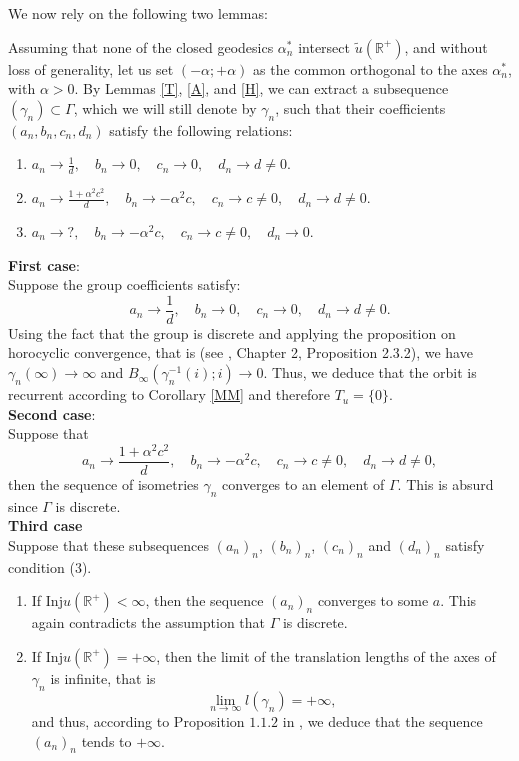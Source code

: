 \documentclass[11pt]{amsart}
\begin{document}
We now rely on the following two lemmas:

Assuming that none of the closed geodesics $\alpha^{*}_n$ intersect $\tilde{u}(\mathbb{R}^+)$, and without loss of generality, let us set $(-\alpha; +\alpha)$ as the common orthogonal to the axes $\alpha_n^{*}$, with $\alpha > 0$.
By Lemmas \ref{T}, \ref{A}, and \ref{H}, we can extract a subsequence $(\gamma_{n})\subset \Gamma$, which we will still denote by \(\gamma_n\), such that their coefficients \((a_n, b_n, c_n, d_n)\) satisfy the following relations:
\begin{enumerate}
    \item \(a_n \rightarrow \frac{1}{d}, \quad b_n \rightarrow 0, \quad c_n \rightarrow 0, \quad d_n \rightarrow d \neq 0.\)
    \item \(a_n \rightarrow \frac{1 + \alpha^2 c^2}{d}, \quad b_n \rightarrow -\alpha^2 c, \quad c_n \rightarrow c \neq 0, \quad d_n \rightarrow d \neq 0.\)
    \item \(a_n \rightarrow ?, \quad b_n \rightarrow -\alpha^2 c, \quad c_n \rightarrow c \neq 0, \quad d_n \rightarrow 0.\)
\end{enumerate}
\textbf{First case}:\\
Suppose the group coefficients satisfy: 
\[ a_n \rightarrow \frac{1}{d}, \quad b_n \rightarrow 0, \quad c_n \rightarrow 0, \quad d_n \rightarrow d \neq 0. \]
Using the fact that the group is discrete and applying the proposition on horocyclic convergence, that is (see \textbf{\cite{BellisThesis}}, Chapter 2, Proposition 2.3.2), we have \(\gamma_n(\infty) \rightarrow \infty\) and \(B_{\infty}(\gamma_n^{-1}(i); i) \rightarrow 0\). 
Thus, we deduce that the orbit is recurrent according to Corollary \ref{MM} and therefore \(T_u = \{0\}.\)\\
\textbf{Second case}: \\
Suppose that 
\[
a_n \rightarrow \frac{1+\alpha^{2} c^{2}}{d}, \quad b_n \rightarrow -\alpha^{2} c, \quad c_n \rightarrow c \neq 0, \quad d_n \rightarrow d \neq 0,
\]
then the sequence of isometries \(\gamma_n\) converges to an element of \(\Gamma\). This is absurd since \(\Gamma\) is discrete.\\
\textbf{Third case} \\
Suppose that these subsequences \((a_n)_n\), \((b_n)_n\), \((c_n)_n\) and \((d_n)_n\) satisfy condition (3). \\ 
\begin{enumerate}
    \item If \(\mathrm{Inj} u ( \mathbb{R}^+ ) < \infty\), then the sequence \((a_n)_n\) converges to some \(a\). This again contradicts the assumption that \(\Gamma\) is discrete.
    \item If \(\mathrm{Inj} u ( \mathbb{R}^+ ) = +\infty\), then the limit of the translation lengths of the axes of \(\gamma_n\) is infinite, that is 
    \[
    \lim_{n \to \infty} l(\gamma_n) = +\infty,
    \]
    and thus, according to Proposition $1.1.2$ in \cite{BellisThesis}, we deduce that the sequence \((a_n)_n\) tends to \(+\infty\).
\end{enumerate}
\end{document}
